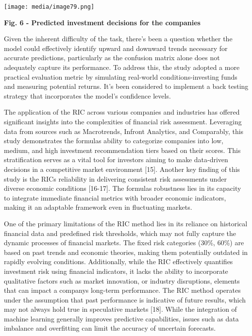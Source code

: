 \documentclass[
]{article}
\begin{document}
\texttt{[image: media/image79.png]}

\textbf{Fig. 6 - Predicted investment decisions for the companies}

Given the inherent difficulty of the task, there's been a question
whether the model could effectively identify upward and downward trends
necessary for accurate predictions, particularly as the confusion matrix
alone does not adequately capture its performance. To address this, the
study adopted a more practical evaluation metric by simulating
real-world conditions-investing funds and measuring potential returns.
It's been considered to implement a back testing strategy that
incorporates the model's confidence levels.

The application of the RIC across various companies and industries has
offered significant insights into the complexities of financial risk
assessment. Leveraging data from sources such as Macrotrends, Infront
Analytics, and Comparably, this study demonstrates the
formula\textquotesingle s ability to categorize companies into low,
medium, and high investment recommendation tiers based on their scores.
This stratification serves as a vital tool for investors aiming to make
data-driven decisions in a competitive market environment {[}15{]}.
Another key finding of this study is the RIC\textquotesingle s
reliability in delivering consistent risk assessments under diverse
economic conditions {[}16-17{]}. The formula\textquotesingle s
robustness lies in its capacity to integrate immediate financial metrics
with broader economic indicators, making it an adaptable framework even
in fluctuating markets.

One of the primary limitations of the RIC method lies in its reliance on
historical financial data and predefined risk thresholds, which may not
fully capture the dynamic processes of financial markets. The fixed risk
categories (30\%, 60\%) are based on past trends and economic theories,
making them potentially outdated in rapidly evolving conditions.
Additionally, while the RIC effectively quantifies investment risk using
financial indicators, it lacks the ability to incorporate qualitative
factors such as market innovation, or industry disruptions, elements
that can impact a company\textquotesingle s long-term performance. The
RIC method operates under the assumption that past performance is
indicative of future results, which may not always hold true in
speculative markets {[}18{]}. While the integration of machine learning
generally improves predictive capabilities, issues such as data
imbalance and overfitting can limit the accuracy of uncertain forecasts.
\end{document}
